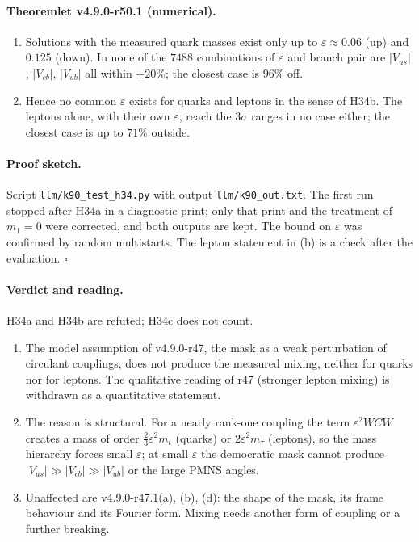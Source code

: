 \paragraph{Theoremlet v4.9.0-r50.1 (numerical).}
\begin{enumerate}[leftmargin=2em]
\item[(a)] Solutions with the measured quark masses exist only up to \(\varepsilon\approx0.06\) (up) and \(0.125\) (down).  In none of the
\(7488\) combinations of \(\varepsilon\) and branch pair are \(|V_{us}|\), \(|V_{cb}|\), \(|V_{ub}|\) all within \(\pm20\%\); the closest case is
\(96\%\) off.
\item[(b)] Hence no common \(\varepsilon\) exists for quarks and leptons in the sense of H34b.  The leptons alone, with their own
\(\varepsilon\), reach the \(3\sigma\) ranges in no case either; the closest case is up to \(71\%\) outside.
\end{enumerate}

\paragraph{Proof sketch.}
Script \texttt{llm/k90\_test\_h34.py} with output \texttt{llm/k90\_out.txt}.  The first run stopped after H34a in a diagnostic print; only that
print and the treatment of \(m_1=0\) were corrected, and both outputs are kept.  The bound on \(\varepsilon\) was confirmed by random multistarts.
The lepton statement in (b) is a check after the evaluation.  \(\square\)

\paragraph{Verdict and reading.}
H34a and H34b are refuted; H34c does not count.
\begin{enumerate}[leftmargin=2em]
\item The model assumption of v4.9.0-r47, the mask as a weak perturbation of circulant couplings, does not produce the measured mixing,
neither for quarks nor for leptons.  The qualitative reading of r47 (stronger lepton mixing) is withdrawn as a quantitative statement.
\item The reason is structural.  For a nearly rank-one coupling the term \(\varepsilon^2WCW\) creates a mass of order
\(\tfrac23\varepsilon^2m_t\) (quarks) or \(2\varepsilon^2m_\tau\) (leptons), so the mass hierarchy forces small \(\varepsilon\); at small
\(\varepsilon\) the democratic mask cannot produce \(|V_{us}|\gg|V_{cb}|\gg|V_{ub}|\) or the large PMNS angles.
\item Unaffected are v4.9.0-r47.1(a), (b), (d): the shape of the mask, its frame behaviour and its Fourier form.  Mixing needs another
form of coupling or a further breaking.
\end{enumerate}

